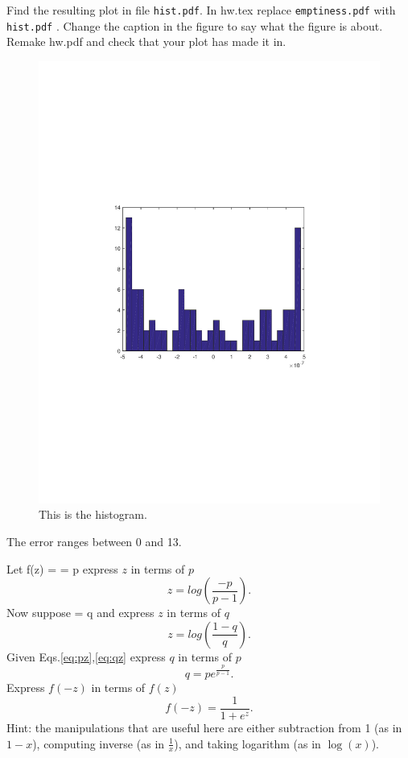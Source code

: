 \documentclass{article}
\begin{document}
Find the resulting plot in file {\tt hist.pdf}. In hw\theHW.tex replace {\tt emptiness.pdf} with {\tt hist.pdf} . Change the
caption in the figure to say what the figure is about. Remake hw\theHW.pdf and check that your plot has made it in.
\begin{figure}[H]
\begin{center}
\includegraphics[scale=0.5]{hist.pdf}
\caption{This is the histogram.}
\end{center}
\end{figure}



\begin{remark} The error ranges between 0 and 13.
\end{remark}


\newproblem{0.5pt}
Let
\BEQ\label{eq:pz}
f(z) =  = p
\EEQ
express $z$ in terms of $p$
\[
z =  log(\frac{-p}{p-1}).
\]
Now suppose
\BEQ\label{eq:qz}
 = q
\EEQ
and express $z$ in terms of $q$
\[
z =  log(\frac{1-q}{q}).  %
\]
Given Eqs.\eqref{eq:pz},\eqref{eq:qz} express $q$ in terms of $p$
\[
q = pe^\frac{p}{p-1}.
\]
Express $f(-z)$ in terms of $f(z)$
\[
f(-z) = \frac{1}{1+e^z}.
\]
Hint: the manipulations that are useful here are either subtraction from 1 (as in $1-x$), computing inverse (as in $\frac{1}{x}$), and taking logarithm (as in $\log(x)$).
\end{document}
